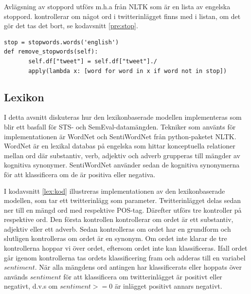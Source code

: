 \documentclass{kaumasters} %
\begin{document}
Avlägsning av stoppord utförs m.h.a  \cite{impl:007} från NLTK som är en lista av engelska stoppord.  kontrollerar om något ord i twitterinlägget finns med i listan, om det gör det tas det bort, se kodavsnitt \ref{pre:stop}.
\begin{lstlisting}[style=mypython,caption={Funktion för att avlägsna stoppord.},label=pre:stop]
stop = stopwords.words('english')
def remove_stopwords(self):
       self.df["tweet"] = self.df["tweet"]./
       apply(lambda x: [word for word in x if word not in stop])
\end{lstlisting}
\subsection{Lexikon}\label{impl:lex}
I detta avsnitt diskuteras hur den lexikonbaserade modellen implementeras som blir ett basfall för STS- och SemEval-datamängden. Tekniker som använts för implementationen är WordNet \cite{lex:001} och SentiWordNet \cite{lex:002} från python-paketet NLTK.
WordNet är en lexikal databas på engelska som hittar konceptuella relationer mellan ord där substantiv, verb, adjektiv och adverb grupperas till mängder av kognitiva synonymer. SentiWordNet använder sedan de kognitiva synonymerna för att klassificera om de är positiva eller negativa.

I kodavsnitt \ref{lex:kod} illustreras implementationen av den lexikonbaserade modellen, som tar ett twitterinlägg som parameter. Twitterinlägget delas sedan ner till en mängd ord med respektive POS-tag. Därefter utförs tre kontroller på respektive ord. Den första kontrollen kontrollerar om ordet är ett substantiv, adjektiv eller ett adverb. Sedan kontrolleras om ordet har en grundform och slutligen kontrolleras om ordet är en synonym. Om ordet inte klarar de tre kontrollerna hoppar vi över ordet, eftersom ordet inte kan klassificeras. Ifall ordet går igenom kontrollerna tas ordets klassificering fram och adderas till en variabel $sentiment$. När alla mängdens ord antingen har klassificerats eller hoppats över används $sentiment$ för att klassificera om twitterinlägget är positivt eller negativt, d.v.s om $sentiment >= 0$ är inlägget positivt annars negativt.
\end{document}
